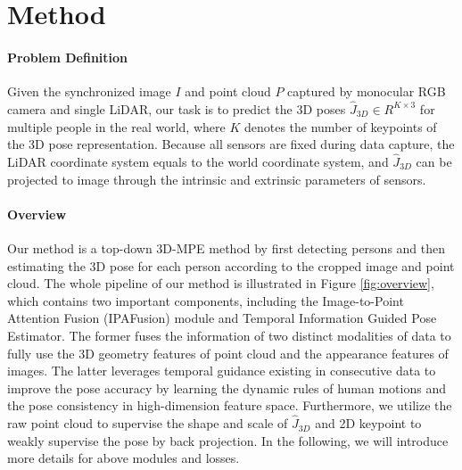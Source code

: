 \documentclass[letterpaper]{article} %
\begin{document}
\section{Method}

\paragraph{Problem Definition} 
Given the synchronized image $I$ and point cloud $P$ captured by monocular RGB camera and single LiDAR, our task is to predict the 3D poses $\hat{J}_{3D} \in R^{K \times 3}$ for multiple people in the real world, where $K$ denotes the number of keypoints of the 3D pose representation. Because all sensors are fixed during data capture, the LiDAR coordinate system equals to the world coordinate system, and $\hat{J}_{3D}$ can be projected to image through the intrinsic and extrinsic parameters of sensors. 


\paragraph{Overview} Our method is a top-down 3D-MPE method by first detecting persons and then estimating the 3D pose for each person according to the cropped image and point cloud. The whole pipeline of our method is illustrated in Figure \ref{fig:overview}, which contains two important components, including the Image-to-Point Attention Fusion (IPAFusion) module and Temporal Information Guided Pose Estimator. The former fuses the information of two distinct modalities of data to fully use the 3D geometry features of point cloud and the appearance features of images. The latter leverages temporal guidance existing in consecutive data to improve the pose accuracy by learning the dynamic rules of human motions and the pose consistency in high-dimension feature space. Furthermore, we utilize the raw point cloud to supervise the shape and scale of $\hat{J}_{3D}$ and 2D keypoint to weakly supervise the pose by back projection. In the following, we will introduce more details for above modules and losses. 
\end{document}
